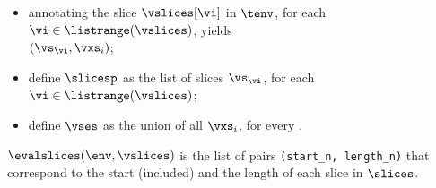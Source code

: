\ProseParagraph
\AllApply
\begin{itemize}
  \item annotating the slice $\vslices[\vi]$ in $\tenv$, for each $\vi\in\listrange(\vslices)$, yields \\
        $(\vs_\vi, \vxs_i)$\ProseOrTypeError;
  \item define $\slicesp$ as the list of slices $\vs_\vi$, for each $\vi\in\listrange(\vslices)$;
  \item define $\vses$ as the union of all $\vxs_i$, for every .
\end{itemize}
\FormallyParagraph
\begin{mathpar}
\end{mathpar}


\ProseParagraph
$\evalslices(\env, \vslices)$ is the list of pairs \texttt{(start\_n, length\_n)} that
correspond to the start (included) and the length of each slice in
$\slices$.

